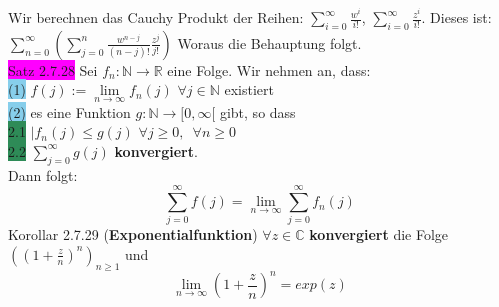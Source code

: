 \documentclass[landscape, 10pt]{article}
\newcommand{\R}{\mathbb{R}}
\newcommand{\N}{\mathbb{N}}
\newcommand{\C}{\mathbb{C}}
\begin{document}
\begin{multicols}{3}
                     Wir berechnen das Cauchy Produkt der 
                     Reihen: \textcolor{NavyBlue}{
                     $\sum_{i=0}^\infty\frac{w^i}{i!}$},
                     \textcolor{NavyBlue}{
                     $\sum_{i=0}^\infty\frac{z^i}{i!}$}.
                     Dieses ist:
                     \textcolor{NavyBlue}{
                     $\sum_{n=0}^\infty(\sum_{j=0}^n
                     \frac{w^{n-j}}{(n-j)!}
                     \frac{z^j}{j!})$} Woraus die Behauptung folgt.\\
              \colorbox{magenta}{Satz 2.7.28} 
                     Sei \textcolor{NavyBlue}{$f_n:\N\longrightarrow\R$} 
                     eine Folge. Wir nehmen an, dass: \\
                     \colorbox{SkyBlue}{(1)} 
                            \textcolor{NavyBlue}{
                            $f(j):=\lim\limits_{n\to\infty}f_n(j)$\quad
                            $\forall j\in\N$} 
                            existiert \\
                     \colorbox{SkyBlue}{(2)} es eine Funktion 
                            \textcolor{NavyBlue}{
                            $g:\N\longrightarrow[0,\infty[$} gibt,
                            so dass \\
                            \colorbox{SeaGreen}{2.1} 
                                   \textcolor{NavyBlue}{
                                   $|f_n(j)\leqslant g(j)$\quad
                                   $\forall j\geqslant0,\enspace
                                   \forall n\geqslant0$} \\
                            \colorbox{SeaGreen}{2.2}
                                   \textcolor{NavyBlue}{$\sum_{j=0}^\infty g(j)$} 
                                   \textbf{konvergiert}. \\
                            Dann folgt: 
                            \begin{equation*}
                                   \sum_{j=0}^\infty f(j)
                                   =\lim\limits_{n\to\infty}
                                   \sum_{j=0}^\infty f_n(j)
                            \end{equation*}
              \colorbox{BurntOrange}{Korollar 2.7.29} 
              (\textbf{Exponentialfunktion})
                     \textcolor{NavyBlue}{
                     $\forall z\in\C$} \textbf{konvergiert} die Folge 
                     \textcolor{NavyBlue}{
                     $((1+\frac{z}{n})^n)_{n\geqslant1}$} und 
                     \begin{equation*}
                            \lim\limits_{n\to\infty}
                            (1+\frac{z}{n})^n=exp(z)
                     \end{equation*}


\end{multicols}
\end{document}
